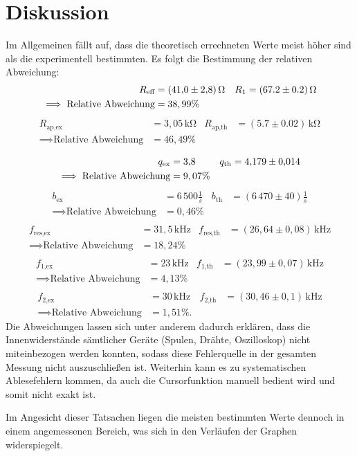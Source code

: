 \section{Diskussion}
\label{sec:Diskussion}

Im Allgemeinen fällt auf, dass die theoretisch errechneten 
Werte meist höher sind als die experimentell bestimmten. Es folgt die Bestimmung der relativen Abweichung:
\begin{align*}
R_\text{eff} &= (\num{41.0 +- 2.8})\,\si{\ohm} & R_1 &= (67.2 \pm 0.2 )\,\si{\ohm} \\
\implies \text{Relative Abweichung} &= 38,99\% \\
\end{align*}
\begin{align*}
R_\text{ap,ex} &= 3,05\,\si{\kilo\ohm} & R_\text{ap,th} &= (5.7 \pm 0.02)\,\si{\kilo\ohm}\\
\implies \text{Relative Abweichung} &= 46,49\% \\
\end{align*}
\begin{align*}
q_\text{ex} &= \num{3.8} & q_\text{th} &= \num{4.179 +-0.014}\\
\implies \text{Relative Abweichung} &= 9,07\% \\
\end{align*}
\begin{align*}
b_\text{ex} &= 6\,500\frac{1}{s} & b_\text{th} &= (6\,470 \pm 40)\frac{1}{s} \\
\implies \text{Relative Abweichung} &= 0,46\% \\
\end{align*}
\begin{align*}
f_\text{res,ex} &= 31,5\, \si{\kilo\hertz} & f_\text{res,th} &= (26,64 \pm 0,08)\,\si{\kilo\hertz}\\
\implies \text{Relative Abweichung} &= 18,24\% \\
\end{align*}
\begin{align*}
f_\text{1,ex} &= 23\,\si{\kilo\hertz} & f_\text{1,th} &= (23,99 \pm 0,07)\,\si{\kilo\hertz}\\
\implies \text{Relative Abweichung} &= 4,13\% \\
\end{align*}
\begin{align*}
f_\text{2,ex} &= 30\,\si{\kilo\hertz} & f_\text{2,th} &= (30,46 \pm 0,1)\,\si{\kilo\hertz} \\
\implies \text{Relative Abweichung} &= 1,51\%.
\end{align*}
Die Abweichungen lassen sich unter anderem dadurch erklären, dass die Innenwiderstände 
sämtlicher Geräte (Spulen, Drähte, Oszilloskop) nicht miteinbezogen werden konnten, 
sodass diese Fehlerquelle in der gesamten Messung nicht auszuschließen ist. Weiterhin kann
es zu systematischen Ablesefehlern kommen, da auch die Cursorfunktion manuell bedient wird
und somit nicht exakt ist.

\noindent Im Angesicht dieser Tatsachen liegen die meisten bestimmten Werte dennoch in einem angemessenen Bereich, was sich in den 
Verläufen der Graphen widerspiegelt.
